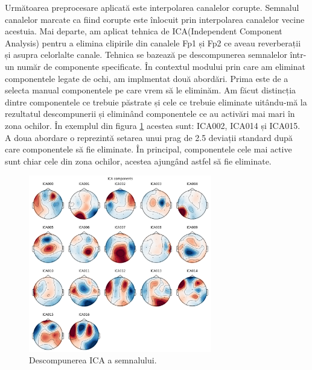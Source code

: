 Următoarea preprocesare aplicată este interpolarea canalelor corupte. Semnalul canalelor marcate ca fiind corupte este înlocuit prin interpolarea canalelor vecine acestuia. Mai departe, am aplicat tehnica de ICA(Independent Component Analysis) pentru a elimina clipirile din canalele Fp1 și Fp2 ce aveau reverberații și asupra celorlalte canale. Tehnica se bazează pe descompunerea semnalelor într-un număr de componente specificate. În contextul modului prin care am eliminat componentele legate de ochi, am implmentat două abordări. Prima este de a selecta manual componentele pe care vrem să le eliminăm. Am făcut distincția dintre componentele ce trebuie păstrate și cele ce trebuie eliminate uitându-mă la rezultatul descompunerii și eliminând componentele ce au activări mai mari în zona ochilor. În exemplul din figura \ref{fig:descompunere_ica} acestea sunt: ICA002, ICA014 și ICA015. A doua abordare o reprezintă setarea unui prag de 2.5 deviații standard după care componentele să fie eliminate. În principal, componentele cele mai active sunt chiar cele din zona ochilor, acestea ajungând astfel să fie eliminate.
\begin{figure}[H]
    \centering
		\vspace{-1em}
    \includegraphics[width=8cm]{images/ica_components.png}
    \caption{Descompunerea ICA a semnalului.}
		\vspace{-1em}
    \label{fig:descompunere_ica}
\end{figure}

